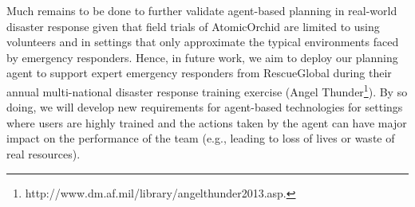 Much remains to be done to further validate agent-based planning in real-world disaster response given that field trials of AtomicOrchid are limited to using volunteers and in settings that only approximate the typical environments faced by emergency responders. Hence, in future work, we aim to deploy our planning agent to support expert emergency responders from RescueGlobal during their annual multi-national disaster response training exercise  (Angel Thunder\footnote{http://www.dm.af.mil/library/angelthunder2013.asp.}). By so doing, we will develop new requirements for agent-based technologies for settings where users are highly trained and the actions taken by the agent can have major impact on the performance of the team (e.g., leading to loss of lives or waste of real resources).
